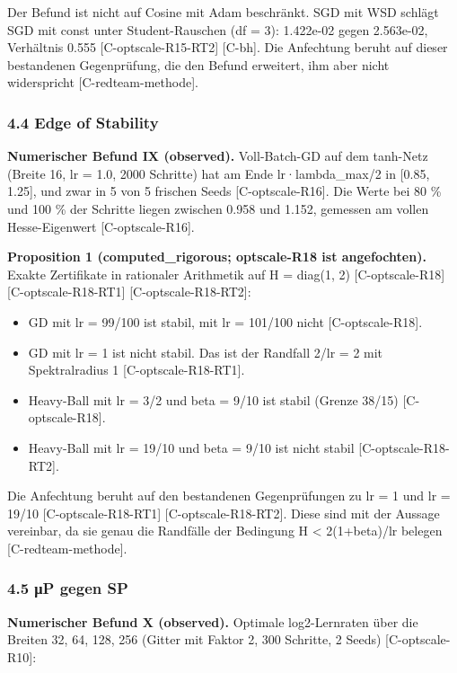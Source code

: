 \documentclass[10pt,twocolumn]{article}
\begin{document}
Der Befund ist nicht auf Cosine mit Adam beschränkt. SGD mit WSD schlägt SGD mit const unter Student-Rauschen (df = 3): 1.422e-02 gegen 2.563e-02, Verhältnis 0.555 {\scriptsize[C-optscale-R15-RT2]} {\scriptsize[C-bh]}. Die Anfechtung beruht auf dieser bestandenen Gegenprüfung, die den Befund erweitert, ihm aber nicht widerspricht {\scriptsize[C-redteam-methode]}.

\subsubsection*{4.4 Edge of Stability}

\textbf{Numerischer Befund IX (observed).} Voll-Batch-GD auf dem tanh-Netz (Breite 16, lr = 1.0, 2000 Schritte) hat am Ende lr·lambda_max/2 in [0.85, 1.25], und zwar in 5 von 5 frischen Seeds {\scriptsize[C-optscale-R16]}. Die Werte bei 80 \% und 100 \% der Schritte liegen zwischen 0.958 und 1.152, gemessen am vollen Hesse-Eigenwert {\scriptsize[C-optscale-R16]}.

\textbf{Proposition 1 (computed_rigorous; optscale-R18 ist angefochten).} Exakte Zertifikate in rationaler Arithmetik auf H = diag(1, 2) {\scriptsize[C-optscale-R18]} {\scriptsize[C-optscale-R18-RT1]} {\scriptsize[C-optscale-R18-RT2]}:
\begin{itemize}
\item GD mit lr = 99/100 ist stabil, mit lr = 101/100 nicht {\scriptsize[C-optscale-R18]}.
\item GD mit lr = 1 ist nicht stabil. Das ist der Randfall 2/lr = 2 mit Spektralradius 1 {\scriptsize[C-optscale-R18-RT1]}.
\item Heavy-Ball mit lr = 3/2 und beta = 9/10 ist stabil (Grenze 38/15) {\scriptsize[C-optscale-R18]}.
\item Heavy-Ball mit lr = 19/10 und beta = 9/10 ist nicht stabil {\scriptsize[C-optscale-R18-RT2]}.
\end{itemize}

Die Anfechtung beruht auf den bestandenen Gegenprüfungen zu lr = 1 und lr = 19/10 {\scriptsize[C-optscale-R18-RT1]} {\scriptsize[C-optscale-R18-RT2]}. Diese sind mit der Aussage vereinbar, da sie genau die Randfälle der Bedingung H < 2(1+beta)/lr belegen {\scriptsize[C-redteam-methode]}.

\subsubsection*{4.5 μP gegen SP}

\textbf{Numerischer Befund X (observed).} Optimale log2-Lernraten über die Breiten 32, 64, 128, 256 (Gitter mit Faktor 2, 300 Schritte, 2 Seeds) {\scriptsize[C-optscale-R10]}:
\end{document}
